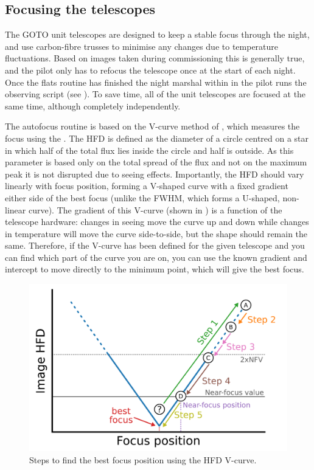 \subsection{Focusing the telescopes}
\label{sec:autofocus}
\begin{colsection}

The GOTO unit telescopes are designed to keep a stable focus through the night, and use carbon-fibre trusses to minimise any changes due to temperature fluctuations. Based on images taken during commissioning this is generally true, and the pilot only has to refocus the telescope once at the start of each night. Once the flats routine has finished the night marshal within in the pilot runs the  observing script (see ). To save time, all of the unit telescopes are focused at the same time, although completely independently.

The autofocus routine is based on the V-curve method of \citet{autofocus}, which measures the focus using the . The HFD is defined as the diameter of a circle centred on a star in which half of the total flux lies inside the circle and half is outside. As this parameter is based only on the total spread of the flux and not on the maximum peak it is not disrupted due to seeing effects. Importantly, the HFD should vary linearly with focus position, forming a V-shaped curve with a fixed gradient either side of the best focus (unlike the FWHM, which forms a U-shaped, non-linear curve). The gradient of this V-curve (shown in ) is a function of the telescope hardware: changes in seeing move the curve up and down while changes in temperature will move the curve side-to-side, but the shape should remain the same. Therefore, if the V-curve has been defined for the given telescope and you can find which part of the curve you are on, you can use the known gradient and intercept to move directly to the minimum point, which will give the best focus.

\begin{figure}[t]
    \begin{center}
        \includegraphics[width=0.8\linewidth]{images/autofocus.pdf}
    \end{center}
    \caption[Steps to find the best focus position using the HFD V-curve]{
        Steps to find the best focus position using the HFD V-curve.
    }\label{fig:autofocus}
\end{figure}


\end{colsection}
